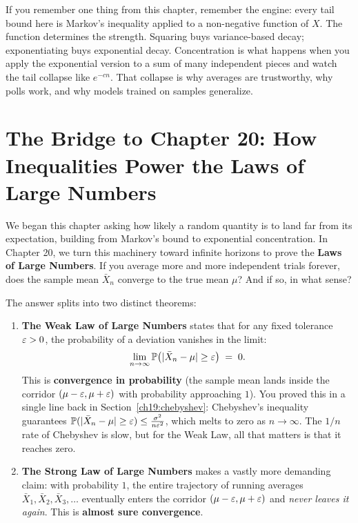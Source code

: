\begin{recoverybox}
If you remember one thing from this chapter, remember the engine: every tail
bound here is Markov's inequality applied to a non-negative function of $X$.
The function determines the strength. Squaring buys variance-based decay;
exponentiating buys exponential decay. Concentration is what happens when you
apply the exponential version to a sum of many independent pieces and watch the
tail collapse like $e^{-cn}$. That collapse is why averages are trustworthy,
why polls work, and why models trained on samples generalize.
\end{recoverybox}

\section{The Bridge to Chapter 20: How Inequalities Power the Laws of Large Numbers}
\label{ch19:bridge}

We began this chapter asking how likely a random quantity is to land far from
its expectation, building from Markov's bound to exponential concentration.
In Chapter 20, we turn this machinery toward infinite horizons to prove the
\textbf{Laws of Large Numbers}. If you average more and more independent trials
forever, does the sample mean $\bar X_n$ converge to the true mean $\mu$? And if
so, in what sense?

The answer splits into two distinct theorems:

\begin{enumerate}
  \item \textbf{The Weak Law of Large Numbers} states that for any fixed tolerance
        $\varepsilon > 0$, the probability of a deviation vanishes in the limit:
        \[
          \lim_{n\to\infty} \operatorname{\mathbb{P}}\bigl(\lvert\bar X_n - \mu\rvert \ge \varepsilon\bigr) \;=\; 0.
        \]
        This is \textbf{convergence in probability} (the sample mean lands inside
        the corridor $(\mu-\varepsilon, \mu+\varepsilon)$ with probability approaching $1$).
        You proved this in a single line back in Section~\ref{ch19:chebyshev}:
        Chebyshev's inequality guarantees
        $\operatorname{\mathbb{P}}(\lvert\bar X_n - \mu\rvert \ge \varepsilon) \le \frac{\sigma^2}{n\varepsilon^2}$, which
        melts to zero as $n\to\infty$. The $1/n$ rate of Chebyshev is slow, but
        for the Weak Law, all that matters is that it reaches zero.

  \item \textbf{The Strong Law of Large Numbers} makes a vastly more demanding
        claim: with probability $1$, the entire trajectory of running averages
        $\bar X_1, \bar X_2, \bar X_3, \dots$ eventually enters the corridor
        $(\mu - \varepsilon, \mu + \varepsilon)$ and \emph{never leaves it again}. This is
        \textbf{almost sure convergence}.
\end{enumerate}

